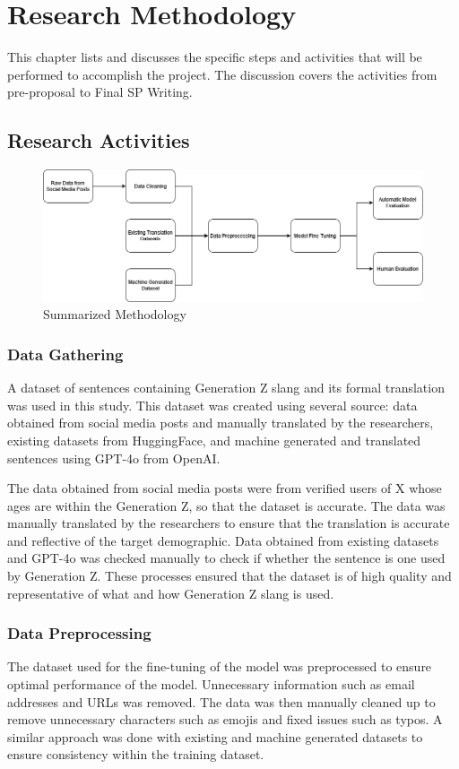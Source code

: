 \chapter{Research Methodology}
This chapter lists and discusses the specific steps and activities that will be performed to accomplish the project. 
The discussion covers the activities from pre-proposal to Final SP Writing.

\section{Research Activities}
\begin{figure}[htbp]
	\centering
	\includegraphics[scale=0.5]{figures/methodology.png}
	\caption{Summarized Methodology}
\end{figure}
\subsection{Data Gathering} 
A dataset of sentences containing Generation Z slang and its formal translation was used in this study. 
This dataset was created using several source: data obtained from social media posts and manually translated by the researchers, existing datasets from HuggingFace, and machine generated and translated sentences using GPT-4o from OpenAI.

The data obtained from social media posts were from verified users of X whose ages are within the Generation Z, so that the dataset is accurate. The data was manually translated by the researchers to ensure that the translation is accurate and reflective of the target demographic. Data obtained from existing datasets and GPT-4o was checked manually to check if whether the sentence is one used by Generation Z. These processes ensured that the dataset is of high quality and representative of what and how Generation Z slang is used.

\subsection{Data Preprocessing} 
The dataset used for the fine-tuning of the model was preprocessed to ensure optimal performance of the model.
Unnecessary information such as email addresses and URLs was removed. The data was then manually cleaned up to remove unnecessary characters such as emojis and fixed issues such as typos. A similar approach was done with existing and machine generated datasets to ensure consistency within the training dataset.

